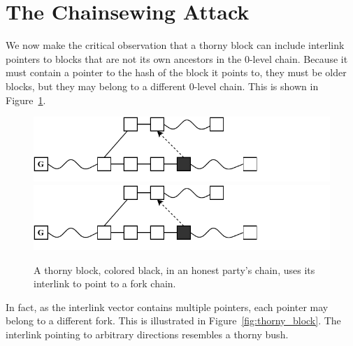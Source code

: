 \section{The Chainsewing Attack}\label{sec:attack}
We now make the critical observation that a thorny block can include interlink
pointers to blocks that are not its own ancestors in the $0$-level chain.
Because it must contain a pointer to the hash of the block it points to, they
must be older blocks, but they may belong to a
different $0$-level chain. This is shown in Figure~\ref{fig:false_interlink}.

\begin{figure}[h]
	\begin{center}
		\iftwocolumn
			\includegraphics[width=0.9\columnwidth]{figures/false_interlink.pdf}
		\else
			\includegraphics[width=0.7\columnwidth]{figures/false_interlink.pdf}
		\fi
	\end{center}
    \caption{A thorny block, colored black, in an honest party's chain, uses its interlink to point to a fork chain.}
	\label{fig:false_interlink}
\end{figure}

In fact, as the interlink vector contains multiple pointers, each pointer may
belong to a different fork. This is illustrated in
Figure~\ref{fig:thorny_block}. The interlink pointing to arbitrary directions
resembles a thorny bush.

